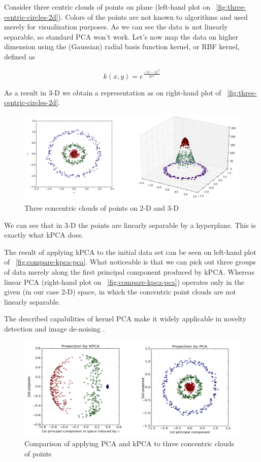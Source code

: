 Consider three centric clouds of points on plane (left-hand plot on ~\autoref{fig:three-centric-circles-2d}). Colors of the points are not known to algorithms and used merely for visualization purposes. As we can see the data is not linearly separable, so standard PCA won't work. Let's now map the data on higher dimension using the (Gaussian) radial basis function kernel, or RBF kernel, defined as

\begin{equation}
	k({x},{y})=e^{{\frac  {-||{x}-{y}||^{2}}{2\sigma ^{2}}}}
\end{equation}
%

As a result in 3-D we obtain a representation as on right-hand plot of ~\autoref{fig:three-centric-circles-2d}.

\begin{figure}[h]
	\centering
	\includegraphics[scale=0.35]
	{img/demo-kpca-1.png}
	\caption{\label{fig:three-centric-circles-2d}Three concentric clouds of points on 2-D and 3-D}
\end{figure}

We can see that in 3-D the points are linearly separable by a hyperplane. This is exactly what kPCA does.

The result of applying kPCA to the initial data set can be seen on left-hand plot of ~\autoref{fig:compare-kpca-pca}. What noticeable is that we can pick out three groups of data merely along the first principal component produced by kPCA.  Whereas linear PCA (right-hand plot on ~\autoref{fig:compare-kpca-pca}) operates only in the given (in our case 2-D) space, in which the concentric point clouds are not linearly separable.

The described capabilities of kernel PCA make it widely applicable in novelty detection \citep{hoffman} and image de-noising \citep{mika}.


\begin{figure}[h]
	\centering
	\includegraphics[scale=0.35]
	{img/demo-kpca-2.png}
	\caption{\label{fig:compare-kpca-pca}Comparison of applying PCA and kPCA to three concentric clouds of points}
\end{figure}

